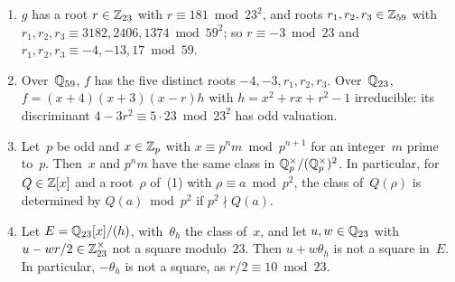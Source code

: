 \begin{lemma}
\label{lem:ds-e2-padic}
\leanok
{}
\begin{enumerate}
  \item $g$ has a root $r \in \mathbb{Z}_{23}$ with $r \equiv 181 \bmod 23^2$, and roots
    $r_1, r_2, r_3 \in \mathbb{Z}_{59}$ with $r_1, r_2, r_3 \equiv 3182, 2406, 1374 \bmod 59^2$; so
    $r \equiv -3 \bmod 23$ and $r_1, r_2, r_3 \equiv -4, -13, 17 \bmod 59$.
  \item Over~$\mathbb{Q}_{59}$, $f$ has the five distinct roots $-4, -3, r_1, r_2, r_3$.
    Over~$\mathbb{Q}_{23}$, $f = (x + 4)(x + 3)(x - r)h$ with $h = x^2 + rx + r^2 - 1$ irreducible: its
    discriminant $4 - 3r^2 \equiv 5 \cdot 23 \bmod 23^2$ has odd valuation.
  \item Let~$p$ be odd and $x \in \mathbb{Z}_p$ with $x \equiv p^n m \bmod p^{n+1}$ for an integer~$m$
    prime to~$p$. Then~$x$ and $p^n m$ have the same class in $\mathbb{Q}_p^\times/(\mathbb{Q}_p^\times)^2$. In
    particular, for $Q \in \mathbb{Z}[x]$ and a root~$\rho$ of~(1) with $\rho \equiv a \bmod p^2$, the
    class of~$Q(\rho)$ is determined by $Q(a) \bmod p^2$ if $p^2 \nmid Q(a)$.
  \item Let $E = \mathbb{Q}_{23}[x]/(h)$, with~$\theta_h$ the class of~$x$, and let
    $u, w \in \mathbb{Q}_{23}$ with $u - wr/2 \in \mathbb{Z}_{23}^\times$ not a square modulo~$23$. Then
    $u + w\theta_h$ is not a square in~$E$. In particular, $-\theta_h$ is not a square, as
    $r/2 \equiv 10 \bmod 23$.
\end{enumerate}
\end{lemma}

